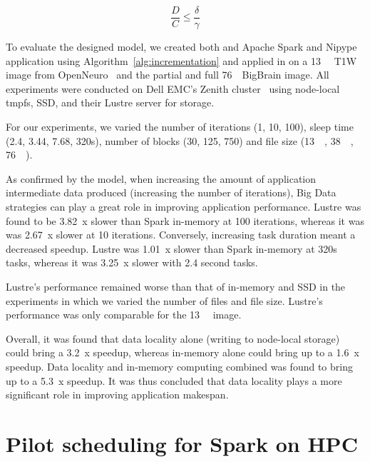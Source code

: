 \documentclass{report}
\begin{document}
        \begin{equation}\label{eq:bd}
            \frac{D}{C} \le \frac{\delta}{\gamma}
        \end{equation}

        To evaluate the designed model, we created both and Apache Spark and 
        Nipype application using
        Algorithm~\ref{alg:incrementation} and applied in on a \SI{13}{\mega\byte}
        T1W image from OpenNeuro~\cite{openneuro} and the partial
        and full \SI{76}{\gibi\byte}{BigBrain} image. All experiments were conducted
        on Dell EMC's Zenith cluster~\cite{zenith} using node-local tmpfs, SSD,
        and their Lustre server for storage.

        For our experiments, we varied the number of iterations (1, 10, 100),
        sleep time (2.4, 3.44, 7.68, 320s), number of blocks (30, 125, 750) and
        file size (\SI{13}{\mega\byte}, \SI{38}{\gibi\byte}, \SI{76}{\gibi\byte}).
        
        As confirmed by the model, when increasing the amount of application intermediate
        data produced (increasing the number of iterations), Big Data strategies
        can play a great role in improving application performance. Lustre was
        found to be 3.82~x slower than Spark in-memory at 100 iterations, whereas it
        was was 2.67~x slower at 10 iterations. Conversely, increasing task duration
        meant a decreased speedup. Lustre was 1.01~x slower than Spark in-memory
        at 320s tasks, whereas it was 3.25~x slower with 2.4 second tasks.

        Lustre's performance remained worse than that of in-memory and SSD in the
        experiments in which we varied the number of files and file size. Lustre's
        performance was only comparable for the \SI{13}{\mega\byte} image.

        Overall, it was found that data locality alone (writing to node-local storage)
        could bring a 3.2~x speedup,
        whereas in-memory alone could bring up to a 1.6~x speedup. Data locality and
        in-memory computing combined was found to bring up to a 5.3~x speedup.
        It was thus concluded that data locality plays a more significant role in
        improving application makespan.


        \section{Pilot scheduling for Spark on HPC}\label{section:escience2019}
\end{document}
